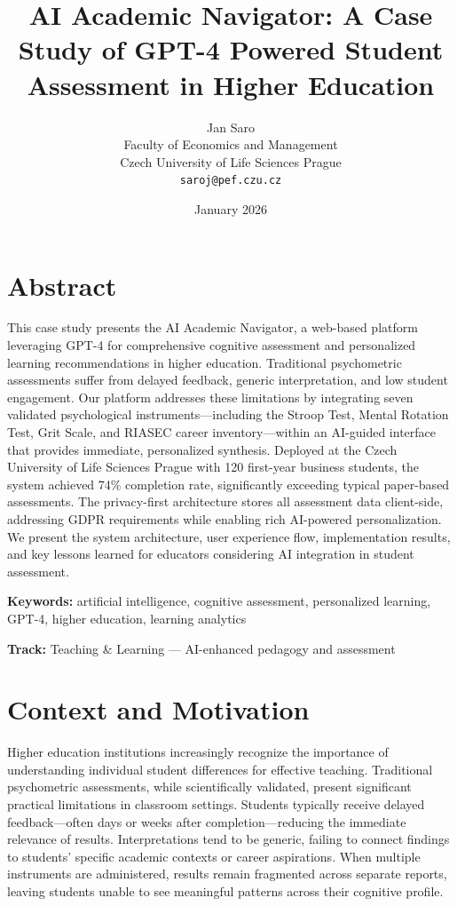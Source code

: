 \documentclass[11pt,a4paper]{article}
\title{\textbf{AI Academic Navigator: A Case Study of GPT-4 Powered Student Assessment in Higher Education}}
\author{
    Jan Saro\\
    Faculty of Economics and Management\\
    Czech University of Life Sciences Prague\\
    \texttt{saroj@pef.czu.cz}
}
\date{January 2026}
\begin{document}
\maketitle

\section*{Abstract}
This case study presents the AI Academic Navigator, a web-based platform leveraging GPT-4 for comprehensive cognitive assessment and personalized learning recommendations in higher education. Traditional psychometric assessments suffer from delayed feedback, generic interpretation, and low student engagement. Our platform addresses these limitations by integrating seven validated psychological instruments---including the Stroop Test, Mental Rotation Test, Grit Scale, and RIASEC career inventory---within an AI-guided interface that provides immediate, personalized synthesis. Deployed at the Czech University of Life Sciences Prague with 120 first-year business students, the system achieved 74\% completion rate, significantly exceeding typical paper-based assessments. The privacy-first architecture stores all assessment data client-side, addressing GDPR requirements while enabling rich AI-powered personalization. We present the system architecture, user experience flow, implementation results, and key lessons learned for educators considering AI integration in student assessment.

\vspace{0.5em}
\noindent\textbf{Keywords:} artificial intelligence, cognitive assessment, personalized learning, GPT-4, higher education, learning analytics

\vspace{0.5em}
\noindent\textbf{Track:} Teaching \& Learning --- AI-enhanced pedagogy and assessment

\section{Context and Motivation}

Higher education institutions increasingly recognize the importance of understanding individual student differences for effective teaching. Traditional psychometric assessments, while scientifically validated, present significant practical limitations in classroom settings. Students typically receive delayed feedback---often days or weeks after completion---reducing the immediate relevance of results. Interpretations tend to be generic, failing to connect findings to students' specific academic contexts or career aspirations. When multiple instruments are administered, results remain fragmented across separate reports, leaving students unable to see meaningful patterns across their cognitive profile.
\end{document}
